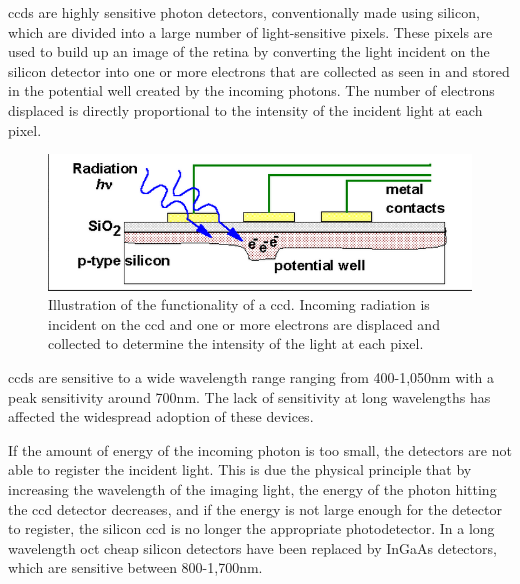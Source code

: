 \Gls{ccd}s are highly sensitive photon detectors, conventionally made using 
silicon, which are divided into a large number of light-sensitive pixels.  These 
pixels are used to build up an image of the retina by converting the light 
incident on the silicon detector into one or more electrons that are collected 
as seen in  and stored in the potential well created by the incoming 
photons. The number of electrons displaced is directly proportional to the 
intensity of the incident light at each pixel.

\begin{figure}[H]
\centering
\includegraphics{figures/CCDSchem}
\caption{Illustration of the functionality of a \Gls{ccd}.  Incoming radiation is incident on the \Gls{ccd} and one or more electrons are displaced and collected to determine the intensity of the light at each pixel. \cite{poo1} }
\label{fig:CCD}
\end{figure}

\Gls{ccd}s are sensitive to a wide wavelength range ranging from 400-1,050nm 
with a peak sensitivity around 700nm. The lack of sensitivity at long wavelengths
has affected the widespread adoption of these devices. \cite{poo2} 
 
If the amount of energy of the incoming photon is too small, the detectors are 
not able to register the incident light. This is due the physical principle that by
increasing the wavelength of the imaging light, the energy of the photon hitting
the \Gls{ccd} detector decreases, and if the energy is not large enough for the
detector to register, the silicon \Gls{ccd} is no longer the appropriate photodetector. 
In a long wavelength \Gls{oct} cheap silicon detectors have been replaced by 
InGaAs detectors, which are sensitive between 800-1,700nm.
